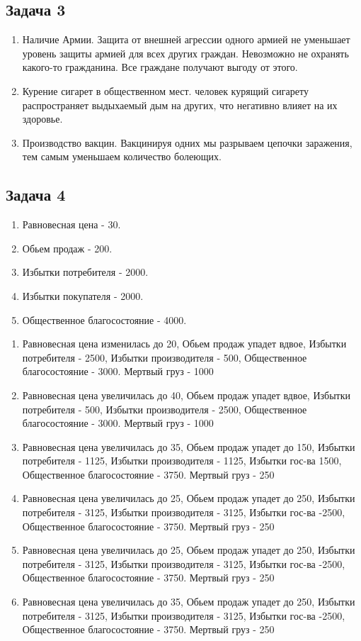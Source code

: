 \documentclass[a4paper,12pt]{article}
\begin{document}
\subsection{Задача 3}
\begin{enumerate}
    \item Наличие Армии. Защита от внешней агрессии одного армией не уменьшает уровень защиты армией для всех других граждан. Невозможно не охранять какого-то гражданина. Все граждане получают выгоду от этого.
    \item Курение сигарет в общественном мест. человек курящий сигарету распространяет выдыхаемый дым на других, что негативно влияет на их здоровье.
    \item Производство вакцин. Вакцинируя одних мы разрываем цепочки заражения, тем самым уменьшаем количество болеющих.
\end{enumerate}

\subsection{Задача 4}
\begin{enumerate}
    \item Равновесная цена - 30. 
    \item Обьем продаж - 200.
    \item Избытки потребителя - 2000. 
    \item Избытки покупателя - 2000. 
    \item Общественное благосостояние - 4000. 
\end{enumerate}

\begin{enumerate}
    \item Равновесная цена изменилась до 20, Обьем продаж упадет вдвое, Избытки потребителя - 2500, Избытки производителя - 500, Общественное благосостояние - 3000. Мертвый груз - 1000
    \item Равновесная цена увеличилась до 40, Обьем продаж упадет вдвое, Избытки потребителя - 500, Избытки производителя - 2500, Общественное благосостояние - 3000. Мертвый груз - 1000
    \item Равновесная цена увеличилась до 35, Обьем продаж упадет до 150, Избытки потребителя - 1125, Избытки производителя - 1125, Избытки гос-ва 1500, Общественное благосостояние - 3750. Мертвый груз - 250
    \item Равновесная цена увеличилась до 25, Обьем продаж упадет до 250, Избытки потребителя - 3125, Избытки производителя - 3125, Избытки гос-ва -2500, Общественное благосостояние - 3750. Мертвый груз - 250
    \item Равновесная цена увеличилась до 25, Обьем продаж упадет до 250, Избытки потребителя - 3125, Избытки производителя - 3125, Избытки гос-ва -2500, Общественное благосостояние - 3750. Мертвый груз - 250
    \item Равновесная цена увеличилась до 35, Обьем продаж упадет до 250, Избытки потребителя - 3125, Избытки производителя - 3125, Избытки гос-ва -2500, Общественное благосостояние - 3750. Мертвый груз - 250

\end{enumerate}
\end{document}
